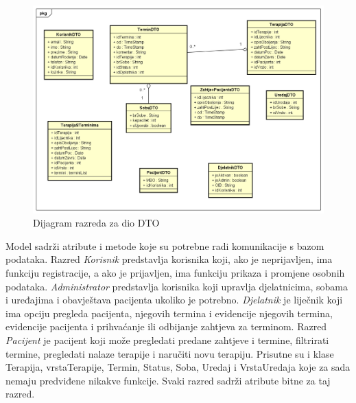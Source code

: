 			\begin{figure}[H]
				\includegraphics[scale=0.4]{slike/Dijagram_razreda_2.PNG} %
				\centering
				\caption{Dijagram razreda za dio DTO}
				\label{fig:dijagram_razreda_2}
			\end{figure}
			
			Model sadrži atribute i metode koje su potrebne radi komunikacije s bazom podataka. Razred \textit{Korisnik} predstavlja korisnika koji, ako je neprijavljen, ima funkciju registracije, a ako je prijavljen, ima funkciju prikaza i promjene osobnih podataka. \textit{Administrator} predstavlja korisnika koji upravlja djelatnicima, sobama i uređajima i obavještava pacijenta ukoliko je potrebno. \textit{Djelatnik} je liječnik koji ima opciju pregleda pacijenta, njegovih termina i evidencije njegovih termina, evidencije pacijenta i prihvaćanje ili odbijanje zahtjeva za terminom. Razred \textit{Pacijent} je pacijent koji može pregledati predane zahtjeve i termine, filtrirati termine, pregledati nalaze terapije i naručiti novu terapiju. Prisutne su i klase Terapija, vrstaTerapije, Termin, Status, Soba, Uredaj i VrstaUredaja koje za sada nemaju predviđene nikakve funkcije. Svaki razred sadrži atribute bitne za taj razred.
			
